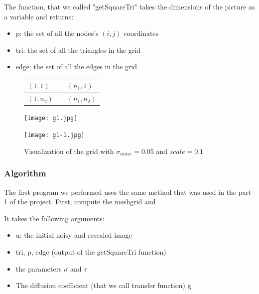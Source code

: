 \documentclass{report}
\begin{document}
The function, that we called "getSquareTri" takes the dimensions of the picture as a variable and returns: 
\begin{itemize}
    \item
    p: the set of all the nodes's $(i,j)$ coordinates 
    \item
    tri: the set of all the triangles in the grid
    \item
    edge: the set of all the edges in the grid 
\end{itemize}
 

 
 
 
 

\begin{figure}[h!]
\centering
\begin{tabular}{|p{1cm}|p{1cm}|p{1cm}|}
  \hline

  $(1,1)$ &    & $(n_1,1)$  \\
 \hline
  $(1,n_2)$ &  & $(n_1,n_2)$\\
  \hline
\end{tabular}
\end{figure}


 
 \begin{figure}[h!]
\label{g1}
 \centering
 \texttt{[image: g1.jpg]}
 \end{figure}
 
 
 

 
 
 
 
 
 \begin{figure}[h!]
 \label{g1-1}
 \caption{Visualization of the grid with ${\sigma}_{noise}=0.05$ and $scale=0.1$}
 \centering
 \texttt{[image: g1-1.jpg]}
 \end{figure}








\subsubsection{Algorithm}

The first program we performed uses the same method that was used in the part 1 of the project. First, compute the meshgrid and 

It takes the following arguments: 
\begin{itemize}
    \item
    u: the initial noisy and rescaled image 
    \item 
    tri, p, edge (output of the getSquareTri function)
    \item
    the parameters $\sigma$ and $\tau $
    \item
    The diffusion coefficient (that we call transfer function) g
\end{itemize}
\end{document}
